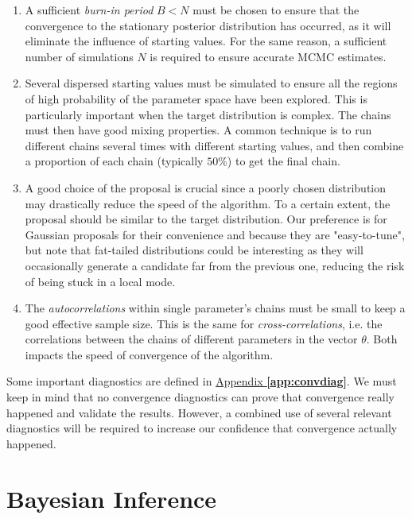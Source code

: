 \begin{enumerate}
	\item A sufficient \emph{burn-in period} $B<N$ must be chosen to ensure that the convergence to the stationary posterior distribution has occurred, as it will eliminate the influence of starting values. For the same reason, a sufficient number of simulations $N$ is required to ensure accurate MCMC estimates.
	\item Several dispersed starting values must be simulated to ensure all the regions of high probability of the parameter space have been explored. This is particularly important when the target distribution is complex. The chains must then have good mixing properties. A common technique is to run different chains several times with different starting values, and then combine a proportion of each chain (typically $50\%$) to get the final chain. %
	\item A good choice of the proposal is crucial since a poorly chosen distribution may drastically reduce the speed of the algorithm. To a certain extent, the proposal should be similar to the target distribution. Our preference is for Gaussian proposals for their convenience and because they are "easy-to-tune", but note that fat-tailed distributions could be interesting as they will occasionally generate a candidate far from the previous one, reducing the risk of being stuck in a local mode.
	\item The \emph{autocorrelations} within single parameter's chains must be small to keep a good effective sample size.
    This is the same for \emph{cross-correlations}, i.e. the correlations between the chains of different parameters in the vector $\theta$.  Both impacts the speed of convergence of the algorithm.
\end{enumerate}
Some important diagnostics are defined in \hyperref[app:convdiag]{Appendix \textbf{\ref{app:convdiag}}}. We must keep in mind that no convergence diagnostics can prove that convergence really happened and validate the results.
However, a combined use of several relevant diagnostics will be required to increase our confidence that convergence actually happened.



\section{Bayesian Inference}\label{sec:bayinf}


